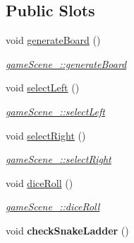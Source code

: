\subsection*{Public Slots}
\begin{DoxyCompactItemize}
\item 
void \hyperlink{classgameScene__1_a8f81fbee2899f19fcab6f47e204843fb}{generate\-Board} ()
\begin{DoxyCompactList}\small\item\em \hyperlink{classgameScene__1_a8f81fbee2899f19fcab6f47e204843fb}{game\-Scene\-\_\-::generate\-Board} \end{DoxyCompactList}\item 
void \hyperlink{classgameScene__1_a20057c5ea6cca6194aa5f5834f71687a}{select\-Left} ()
\begin{DoxyCompactList}\small\item\em \hyperlink{classgameScene__1_a20057c5ea6cca6194aa5f5834f71687a}{game\-Scene\-\_\-::select\-Left} \end{DoxyCompactList}\item 
void \hyperlink{classgameScene__1_a08c914a59a8f2edc33e1cfdff0b4c06f}{select\-Right} ()
\begin{DoxyCompactList}\small\item\em \hyperlink{classgameScene__1_a08c914a59a8f2edc33e1cfdff0b4c06f}{game\-Scene\-\_\-::select\-Right} \end{DoxyCompactList}\item 
void \hyperlink{classgameScene__1_ad115e2a57fa8f9927ba6e4bc22c6361d}{dice\-Roll} ()
\begin{DoxyCompactList}\small\item\em \hyperlink{classgameScene__1_ad115e2a57fa8f9927ba6e4bc22c6361d}{game\-Scene\-\_\-::dice\-Roll} \end{DoxyCompactList}\item 
\hypertarget{classgameScene__1_a75c74fdbc955e234e02750b524a8523f}{void {\bfseries check\-Snake\-Ladder} ()}\label{classgameScene__1_a75c74fdbc955e234e02750b524a8523f}


\end{DoxyCompactItemize}
